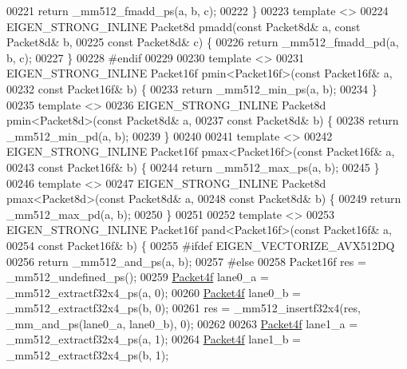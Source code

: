 \begin{DoxyCode}
00221   \textcolor{keywordflow}{return} \_mm512\_fmadd\_ps(a, b, c);
00222 \}
00223 \textcolor{keyword}{template} <>
00224 EIGEN\_STRONG\_INLINE Packet8d pmadd(\textcolor{keyword}{const} Packet8d& a, \textcolor{keyword}{const} Packet8d& b,
00225                                    \textcolor{keyword}{const} Packet8d& c) \{
00226   \textcolor{keywordflow}{return} \_mm512\_fmadd\_pd(a, b, c);
00227 \}
00228 \textcolor{preprocessor}{#endif}
00229 
00230 \textcolor{keyword}{template} <>
00231 EIGEN\_STRONG\_INLINE Packet16f pmin<Packet16f>(\textcolor{keyword}{const} Packet16f& a,
00232                                               \textcolor{keyword}{const} Packet16f& b) \{
00233   \textcolor{keywordflow}{return} \_mm512\_min\_ps(a, b);
00234 \}
00235 \textcolor{keyword}{template} <>
00236 EIGEN\_STRONG\_INLINE Packet8d pmin<Packet8d>(\textcolor{keyword}{const} Packet8d& a,
00237                                             \textcolor{keyword}{const} Packet8d& b) \{
00238   \textcolor{keywordflow}{return} \_mm512\_min\_pd(a, b);
00239 \}
00240 
00241 \textcolor{keyword}{template} <>
00242 EIGEN\_STRONG\_INLINE Packet16f pmax<Packet16f>(\textcolor{keyword}{const} Packet16f& a,
00243                                               \textcolor{keyword}{const} Packet16f& b) \{
00244   \textcolor{keywordflow}{return} \_mm512\_max\_ps(a, b);
00245 \}
00246 \textcolor{keyword}{template} <>
00247 EIGEN\_STRONG\_INLINE Packet8d pmax<Packet8d>(\textcolor{keyword}{const} Packet8d& a,
00248                                             \textcolor{keyword}{const} Packet8d& b) \{
00249   \textcolor{keywordflow}{return} \_mm512\_max\_pd(a, b);
00250 \}
00251 
00252 \textcolor{keyword}{template} <>
00253 EIGEN\_STRONG\_INLINE Packet16f pand<Packet16f>(\textcolor{keyword}{const} Packet16f& a,
00254                                               \textcolor{keyword}{const} Packet16f& b) \{
00255 \textcolor{preprocessor}{#ifdef EIGEN\_VECTORIZE\_AVX512DQ}
00256   \textcolor{keywordflow}{return} \_mm512\_and\_ps(a, b);
00257 \textcolor{preprocessor}{#else}
00258   Packet16f res = \_mm512\_undefined\_ps();
00259   \hyperlink{struct_eigen_1_1internal_1_1_packet4f}{Packet4f} lane0\_a = \_mm512\_extractf32x4\_ps(a, 0);
00260   \hyperlink{struct_eigen_1_1internal_1_1_packet4f}{Packet4f} lane0\_b = \_mm512\_extractf32x4\_ps(b, 0);
00261   res = \_mm512\_insertf32x4(res, \_mm\_and\_ps(lane0\_a, lane0\_b), 0);
00262 
00263   \hyperlink{struct_eigen_1_1internal_1_1_packet4f}{Packet4f} lane1\_a = \_mm512\_extractf32x4\_ps(a, 1);
00264   \hyperlink{struct_eigen_1_1internal_1_1_packet4f}{Packet4f} lane1\_b = \_mm512\_extractf32x4\_ps(b, 1);

\end{DoxyCode}
